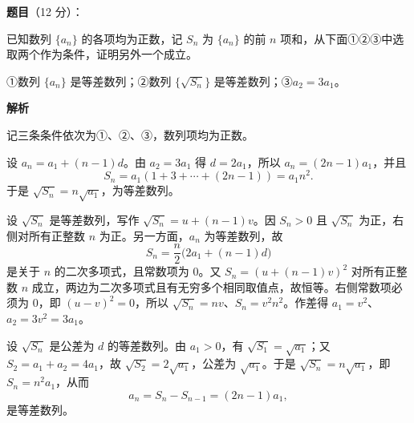 \begin{answer}

\textbf{题目}（12 分）：

已知数列 $\{a_n\}$ 的各项均为正数，记 $S_n$ 为 $\{a_n\}$ 的前 $n$ 项和，从下面①②③中选取两个作为条件，证明另外一个成立。

①数列 $\{a_n\}$ 是等差数列；②数列 $\{\sqrt{S_n}\}$ 是等差数列；③$a_2=3a_1$。

\textbf{解析}

记三条条件依次为①、②、③，数列项均为正数。


设 $a_n=a_1+(n-1)d$。由 $a_2=3a_1$ 得 $d=2a_1$，所以 $a_n=(2n-1)a_1$，并且
\nopagebreak[4]
\[
S_n=a_1(1+3+\cdots+(2n-1))=a_1n^2.
\]
于是 $\sqrt{S_n}=n\sqrt{a_1}$，为等差数列。


设 $\sqrt{S_n}$ 是等差数列，写作 $\sqrt{S_n}=u+(n-1)v$。因 $S_n>0$ 且 $\sqrt{S_n}$ 为正，右侧对所有正整数 $n$ 为正。另一方面，$a_n$ 为等差数列，故
\nopagebreak[4]
\[
S_n=\frac n2\bigl(2a_1+(n-1)d\bigr)
\]
是关于 $n$ 的二次多项式，且常数项为 $0$。又 $S_n=(u+(n-1)v)^2$ 对所有正整数 $n$ 成立，两边为二次多项式且有无穷多个相同取值点，故恒等。右侧常数项必须为 $0$，即 $(u-v)^2=0$，所以 $\sqrt{S_n}=nv$、$S_n=v^2n^2$。作差得 $a_1=v^2$、$a_2=3v^2=3a_1$。


设 $\sqrt{S_n}$ 是公差为 $d$ 的等差数列。由 $a_1>0$，有 $\sqrt{S_1}=\sqrt{a_1}$；又 $S_2=a_1+a_2=4a_1$，故 $\sqrt{S_2}=2\sqrt{a_1}$，公差为 $\sqrt{a_1}$。于是 $\sqrt{S_n}=n\sqrt{a_1}$，即 $S_n=n^2a_1$，从而
\nopagebreak[4]
\[
a_n=S_n-S_{n-1}=(2n-1)a_1,
\]
是等差数列。


\end{answer}
